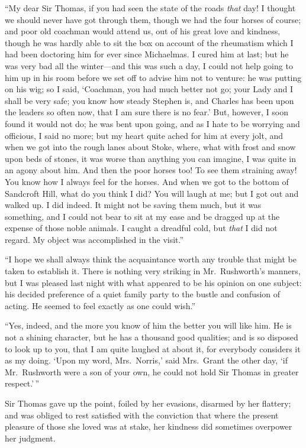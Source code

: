 ``My dear Sir Thomas, if you had seen the state of the
roads \emph{that} day!  I thought we should never have got
through them, though we had the four horses of course;
and poor old coachman would attend us, out of his great love
and kindness, though he was hardly able to sit the box
on account of the rheumatism which I had been doctoring
him for ever since Michaelmas.  I cured him at last;
but he was very bad all the winter---and this was such a day,
I could not help going to him up in his room before we set
off to advise him not to venture:  he was putting on his wig;
so I said, `Coachman, you had much better not go; your Lady
and I shall be very safe; you know how steady Stephen is,
and Charles has been upon the leaders so often now,
that I am sure there is no fear.'  But, however, I soon
found it would not do; he was bent upon going, and as I
hate to be worrying and officious, I said no more; but my
heart quite ached for him at every jolt, and when we got
into the rough lanes about Stoke, where, what with frost
and snow upon beds of stones, it was worse than anything
you can imagine, I was quite in an agony about him.
And then the poor horses too!  To see them straining away!
You know how I always feel for the horses.  And when we got
to the bottom of Sandcroft Hill, what do you think I did?
You will laugh at me; but I got out and walked up.
I did indeed.  It might not be saving them much, but it
was something, and I could not bear to sit at my ease
and be dragged up at the expense of those noble animals.
I caught a dreadful cold, but \emph{that} I did not regard.
My object was accomplished in the visit.''

``I hope we shall always think the acquaintance worth
any trouble that might be taken to establish it.
There is nothing very striking in Mr.\ Rushworth's manners,
but I was pleased last night with what appeared to be his
opinion on one subject:  his decided preference of a quiet
family party to the bustle and confusion of acting.
He seemed to feel exactly as one could wish.''

``Yes, indeed, and the more you know of him the better
you will like him.  He is not a shining character,
but he has a thousand good qualities; and is so disposed
to look up to you, that I am quite laughed at about it,
for everybody considers it as my doing.  `Upon my word,
Mrs.\ Norris,' said Mrs.\ Grant the other day, `if Mr.\ Rushworth
were a son of your own, he could not hold Sir Thomas
in greater respect.'\,''

Sir Thomas gave up the point, foiled by her evasions,
disarmed by her flattery; and was obliged to rest
satisfied with the conviction that where the present
pleasure of those she loved was at stake, her kindness
did sometimes overpower her judgment.


